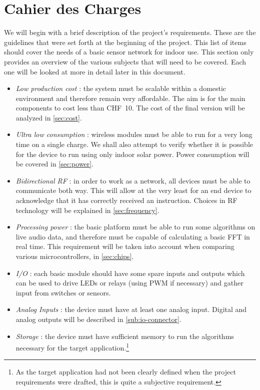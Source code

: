 \section{Cahier des Charges}\label{sec:cdc}

We will begin with a brief description of the project's requirements. These are
the guidelines that were set forth at the beginning of the project. This list of
items should cover the needs of a basic sensor network for indoor use. This
section only provides an overview of the various subjects that will need to be
covered. Each one will be looked at more in detail later in this document.

\begin{itemize}
  \item \emph{Low production cost} :
    the system must be scalable within
    a domestic environment and therefore remain very affordable. The aim is for
    the main components to cost less than CHF~10. The cost of the final version
    will be analyzed in \autoref{sec:cost}.
  \item \emph{Ultra low consumption} :
    wireless modules must be able to run for a very long time on a single
    charge. We shall also attempt to verify whether it is possible for the
    device to run using only indoor solar power.  Power consumption will be
    covered in \autoref{sec:power}.
  \item \emph{Bidirectional RF} : 
    in order to work as a network, all devices must be able to communicate both
    way. This will allow at the very least for an end device to acknowledge
    that it has correctly received an instruction.
    Choices in RF technology will be explained in \autoref{sec:frequency}.
  \item \emph{Processing power} :
    the basic platform must be able to run some algorithms on live audio data,
    and therefore must be capable of calculating a basic \ac{FFT} in real time.
    This requirement will be taken into account when comparing various
    microcontrollers, in \autoref{sec:chips}.
  \item \emph{I/O} :
    each basic module should have some spare inputs and outputs which can be
    used to drive LEDs or relays (using \ac{PWM} if necessary) and gather input
    from switches or sensors.
  \item \emph{Analog Inputs} :
    the device must have at least one analog input. Digital and analog outputs
    will be described in \autoref{sub:io-connector}.
  \item \emph{Storage} :
    the device must have sufficient memory to run the algorithms necessary for
    the target application.\footnote{As the target application had not been
    clearly defined when the project requirements were drafted, this is quite
    a subjective requirement.}
\end{itemize}

